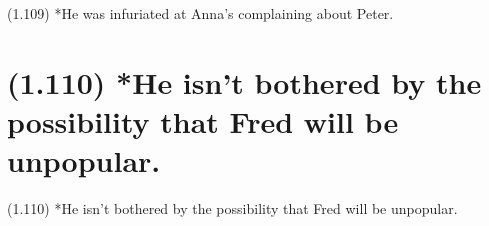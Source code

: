\documentclass{article}
\begin{document}
\bigbreak
\begin{enumerate*}
\item[(1.109)] *He was infuriated at Anna's complaining about Peter.
\end{enumerate*}
\bigbreak

\bigbreak
\begin{minipage}{\textwidth}
\end{minipage}
\bigbreak

\clearpage

%
%

\section*{(1.110) *He isn't bothered by the possibility that Fred will be unpopular.}

\bigbreak
\begin{enumerate*}
\item[(1.110)] *He isn't bothered by the possibility that Fred will be unpopular.
\end{enumerate*}
\bigbreak
\end{document}
